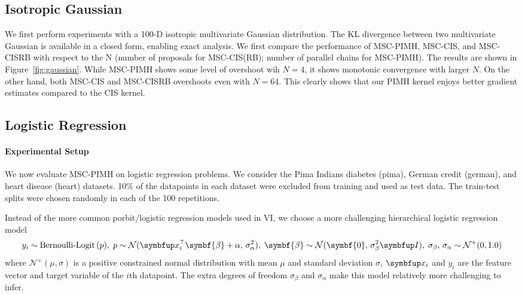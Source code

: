 \subsection{Isotropic Gaussian}
We first perform experiments with a 100-D isotropic multivariate Gaussian distribution.
The KL divergence between two multivariate Gaussian is available in a closed form, enabling exact analysis.
We first compare the performance of MSC-PIMH, MSC-CIS, and MSC-CISRB with respect to the N (number of proposals for MSC-CIS(RB); number of parallel chains for MSC-PIMH).
The results are shown in Figure~\ref{fig:gaussian}.
While MSC-PIMH shows some level of overshoot wih \(N=4\), it shows monotonic convergence with larger \(N\).
On the other hand, both MSC-CIS and MSC-CISRB overshoots even with \(N=64\).
This clearly shows that our PIMH kernel enjoys better gradient estimates compared to the CIS kernel.

\subsection{Logistic Regression}
\paragraph{Experimental Setup}
We now evaluate MSC-PIMH on logistic regression problems.
We consider the Pima Indians diabetes (pima), German credit (german), and heart disease (heart) datasets.
10\% of the datapoints in each dataset were excluded from training and used as test data.
The train-test splits were chosen randomly in each of the 100 repetitions.

Instead of the more common porbit/logistic regression models used in VI, we choose a more challenging hierarchical logistic regression model \\
\begin{equation}
y_i \sim \text{Bernoulli-Logit}\,(p),\;
p \sim \mathcal{N}(\vx_i^{\top}\symbf{\beta} + \alpha,\, \sigma_{\alpha}^2),\;
\symbf{\beta} \sim \mathcal{N}(\symbf{0},\, \sigma_{\beta}^2 \mI),\;
\sigma_{\beta},\,\sigma_{\alpha} \sim \mathcal{N}^{+}(0, 1.0)
\end{equation}
where \(\mathcal{N}^+(\mu, \sigma)\) is a positive constrained normal distribution with mean \(\mu\) and standard deviation \(\sigma\), \(\vx_i\) and \(y_i\) are the feature vector and target variable of the \(i\)th datapoint.
The extra degrees of freedom \(\sigma_{\beta}\) and \(\sigma_{\alpha}\) make this model relatively more challenging to infer.

